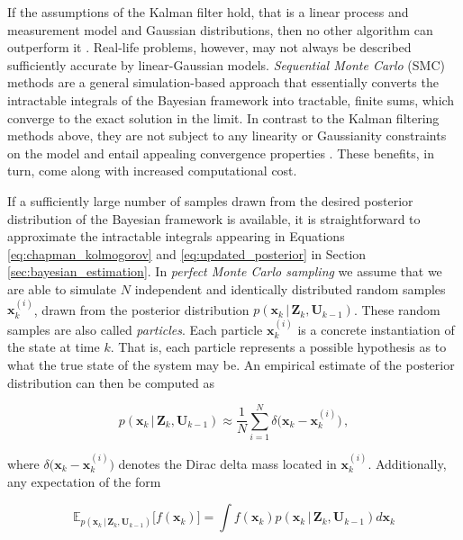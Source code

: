 If the assumptions of the Kalman filter hold, that is a linear process and measurement model and Gaussian distributions, then no other algorithm can outperform it \cite{gaussian_bayesian_tracking2002}. Real-life problems, however, may not always be described sufficiently accurate by linear-Gaussian models. \emph{Sequential Monte Carlo} (SMC) methods are a general simulation-based approach that essentially converts the intractable integrals of the Bayesian framework into tractable, finite sums, which converge to the exact solution in the limit. In contrast to the Kalman filtering methods above, they are not subject to any linearity or Gaussianity constraints on the model and entail appealing convergence properties \cite{doucet1998sequential}. These benefits, in turn, come along with increased computational cost.

If a sufficiently large number of samples drawn from the desired posterior distribution of the Bayesian framework is available, it is straightforward to approximate the intractable integrals appearing in Equations \ref{eq:chapman_kolmogorov} and \ref{eq:updated_posterior} in Section \ref{sec:bayesian_estimation}. In \emph{perfect Monte Carlo sampling} we assume that we are able to simulate  $N$ independent and identically distributed random samples $\bm{x}^{(i)}_k$, drawn from the posterior distribution $p(\bm{x}_k\,|\,\bm{Z}_{k}, \bm{U}_{k-1})$. These random samples are also called \emph{particles}. Each particle $\bm{x}^{(i)}_k$ is a concrete instantiation of the state at time $k$. That is, each particle represents a possible hypothesis as to what the true state of the system may be. An empirical estimate of the posterior distribution can then be computed as

\begin{equation}\label{eq:approximated_posterior}
  p(\bm{x}_k\,|\,\bm{Z}_{k}, \bm{U}_{k-1}) \approx \frac{1}{N} \sum^N_{i = 1} \delta\big(\bm{x}_{k} - \bm{x}^{(i)}_k \big) \,,
\end{equation}

\noindent
where $\delta\big(\bm{x}_{k} - \bm{x}^{(i)}_k\big)$ denotes the Dirac delta mass located in $\bm{x}^{(i)}_k$. Additionally, any expectation of the form

\begin{equation}\label{eq:expectations}
  \mathbb{E}_{p(\bm{x}_k\,|\,\bm{Z}_{k}, \bm{U}_{k-1})}\big[f(\bm{x}_k)\big] = \int f(\bm{x}_k) p(\bm{x}_k\,|\,\bm{Z}_{k}, \bm{U}_{k-1}) d\bm{x}_k
\end{equation}

